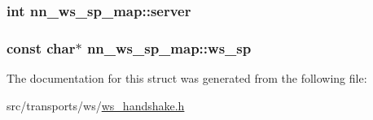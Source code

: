 \subsubsection[{server}]{\setlength{\rightskip}{0pt plus 5cm}int nn\+\_\+ws\+\_\+sp\+\_\+map\+::server}\hypertarget{structnn__ws__sp__map_a91d745d75b88332cd8dfd9a2f5cd59fc}{}\label{structnn__ws__sp__map_a91d745d75b88332cd8dfd9a2f5cd59fc}
\subsubsection[{ws\+\_\+sp}]{\setlength{\rightskip}{0pt plus 5cm}const char$\ast$ nn\+\_\+ws\+\_\+sp\+\_\+map\+::ws\+\_\+sp}\hypertarget{structnn__ws__sp__map_ab9ef6abcd447dbcd233458e0f08eaeb6}{}\label{structnn__ws__sp__map_ab9ef6abcd447dbcd233458e0f08eaeb6}


The documentation for this struct was generated from the following file\+:\begin{DoxyCompactItemize}
\item 
src/transports/ws/\hyperlink{ws__handshake_8h}{ws\+\_\+handshake.\+h}\end{DoxyCompactItemize}
